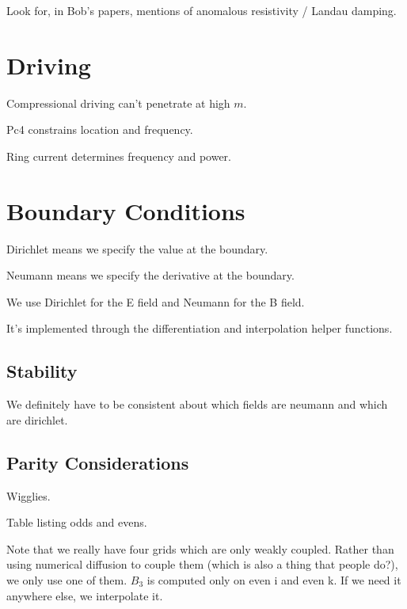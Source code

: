 Look for, in Bob's papers, mentions of anomalous resistivity / Landau damping. 

\section{Driving}

Compressional driving can't penetrate at high $m$. 

Pc4 constrains location and frequency. 

Ring current determines frequency and power. 

\section{Boundary Conditions}

Dirichlet means we specify the value at the boundary. 

Neumann means we specify the derivative at the boundary. 

We use Dirichlet for the E field and Neumann for the B field. 

It's implemented through the differentiation and interpolation helper
functions. 

\subsection{Stability}

We definitely have to be consistent about which fields are neumann and which are
dirichlet. 

\subsection{Parity Considerations}

Wigglies. 

Table listing odds and evens. 

Note that we really have four grids which are only weakly coupled. Rather than
using numerical diffusion to couple them (which is also a thing that people
do?), we only use one of them. $B_3$ is computed only on even i and even k. If
we need it anywhere else, we interpolate it. 


